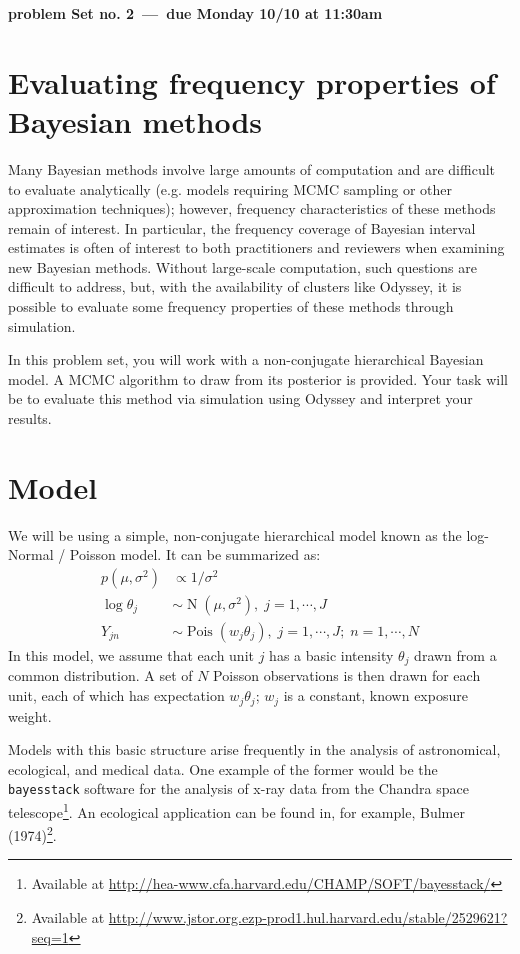 \documentclass[11pt]{article}
\DeclareMathOperator{\Poisson}{Pois}
\DeclareMathOperator{\Gaussian}{N}
\newcommand{\duedate}{Monday 10/10 at 11:30am}
\begin{document}
\centerline{\textbf{problem Set no. 2~---~due \duedate}}


\section{Evaluating frequency properties of Bayesian methods}

Many Bayesian methods involve large amounts of computation and are difficult to evaluate analytically (e.g. models requiring MCMC sampling or other approximation techniques); however, frequency characteristics of these methods remain of interest. In particular, the frequency coverage of Bayesian interval estimates is often of interest to both practitioners and reviewers when examining new Bayesian methods. Without large-scale computation, such questions are difficult to address, but, with the availability of clusters like Odyssey, it is possible to evaluate some frequency properties of these methods through simulation.

In this problem set, you will work with a non-conjugate hierarchical Bayesian model. A MCMC algorithm to draw from its posterior is provided. Your task will be to evaluate this method via simulation using Odyssey and interpret your results.

\section{Model}
\label{sec:model}

We will be using a simple, non-conjugate hierarchical model known as the log-Normal / Poisson model. It can be summarized as:
\begin{align*}
 p(\mu, \sigma^2) &\propto 1/\sigma^2 \\
 \log \theta_j &\sim \Gaussian (\mu, \sigma^2), \; j=1,\cdots,J \\
 Y_{jn} &\sim \Poisson ( w_{j} \theta_j ), \; j=1,\cdots,J; \; n=1,\cdots,N
\end{align*}
In this model, we assume that each unit $j$ has a basic intensity $\theta_j$ drawn from a common distribution. A set of $N$ Poisson observations is then drawn for each unit, each of which has expectation $w_{j} \theta_j$; $w_{j}$ is a constant, known exposure weight.

Models with this basic structure arise frequently in the analysis of astronomical, ecological, and medical data. One example of the former would be the \verb+bayesstack+ software for the analysis of x-ray data from the Chandra space telescope\footnote{Available at \url{http://hea-www.cfa.harvard.edu/CHAMP/SOFT/bayesstack/}}. An ecological application can be found in, for example, Bulmer (1974)\footnote{Available at \url{http://www.jstor.org.ezp-prod1.hul.harvard.edu/stable/2529621?seq=1}}.
\end{document}
